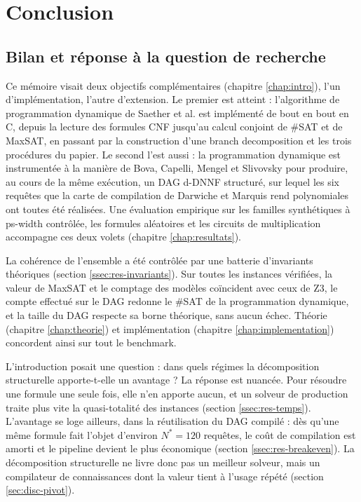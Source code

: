 \documentclass[11pt,a4paper]{report}
\theoremstyle{plain}
\theoremstyle{definition}
\begin{document}
\chapter{Conclusion}
\label{chap:conclusion}

\section{Bilan et réponse à la question de recherche}
\label{sec:concl-bilan}

Ce mémoire visait deux objectifs complémentaires
(chapitre \ref{chap:intro}), l'un d'implémentation, l'autre
d'extension. Le premier est atteint : l'algorithme de programmation
dynamique de Saether et al. \cite{saether2015} est implémenté de bout
en bout en C, depuis la lecture des formules CNF jusqu'au calcul
conjoint de \#SAT et de MaxSAT, en passant par la construction d'une
branch decomposition et les trois procédures du papier. Le second
l'est aussi : la programmation dynamique est instrumentée à la
manière de Bova, Capelli, Mengel et Slivovsky \cite{bova2015} pour
produire, au cours de la même exécution, un DAG d-DNNF structuré, sur
lequel les six requêtes que la carte de compilation de Darwiche et
Marquis \cite{darwiche2002} rend polynomiales ont toutes été
réalisées. Une évaluation empirique sur les familles synthétiques à
ps-width contrôlée, les formules aléatoires et les circuits de
multiplication accompagne ces deux volets
(chapitre \ref{chap:resultats}).

La cohérence de l'ensemble a été contrôlée par une batterie
d'invariants théoriques (section \ref{ssec:res-invariants}). Sur
toutes les instances vérifiées, la valeur de MaxSAT et le comptage des
modèles coïncident avec ceux de Z3, le compte effectué sur le DAG
redonne le \#SAT de la programmation dynamique, et la taille du DAG
respecte sa borne théorique, sans aucun échec. Théorie
(chapitre \ref{chap:theorie}) et implémentation
(chapitre \ref{chap:implementation}) concordent ainsi sur tout le
benchmark.

L'introduction posait une question : dans quels régimes la
décomposition structurelle apporte-t-elle un avantage ? La réponse est
nuancée. Pour résoudre une formule une seule fois, elle n'en apporte
aucun, et un solveur de production traite plus vite la quasi-totalité
des instances (section \ref{ssec:res-temps}). L'avantage se loge
ailleurs, dans la réutilisation du DAG compilé : dès qu'une même
formule fait l'objet d'environ $N^* = 120$ requêtes, le coût de
compilation est amorti et le pipeline devient le plus économique
(section \ref{ssec:res-breakeven}). La décomposition structurelle ne
livre donc pas un meilleur solveur, mais un compilateur de
connaissances dont la valeur tient à l'usage répété
(section \ref{sec:disc-pivot}).
\end{document}
